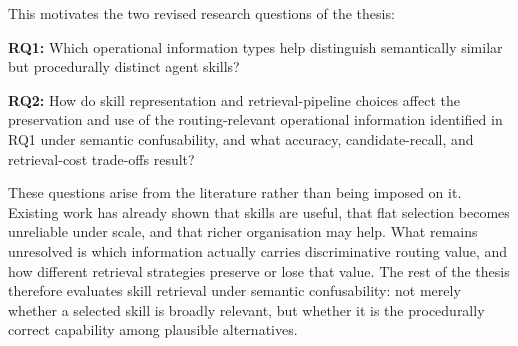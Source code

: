 This motivates the two revised research questions of the thesis:

\textbf{RQ1:} Which operational information types help distinguish semantically similar but procedurally distinct agent skills?

\textbf{RQ2:} How do skill representation and retrieval-pipeline choices affect the preservation and use of the routing-relevant operational information identified in RQ1 under semantic confusability, and what accuracy, candidate-recall, and retrieval-cost trade-offs result?

These questions arise from the literature rather than being imposed on it. Existing work has already shown that skills are useful, that flat selection becomes unreliable under scale, and that richer organisation may help. What remains unresolved is which information actually carries discriminative routing value, and how different retrieval strategies preserve or lose that value. The rest of the thesis therefore evaluates skill retrieval under semantic confusability: not merely whether a selected skill is broadly relevant, but whether it is the procedurally correct capability among plausible alternatives.
